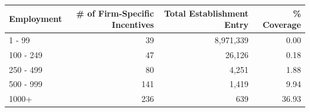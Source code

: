\begin{tabular}{l|rrr}
\hline
Employment & \# of Firm-Specific Incentives & Total Establishment Entry & \% Coverage  \\
\hline
1 - 99&39&8,971,339&0.00\\
100 - 249&47&26,126&0.18\\
250 - 499&80&4,251&1.88\\
500 - 999&141&1,419&9.94\\
1000+&236&639&36.93\\
\hline
\end{tabular}
